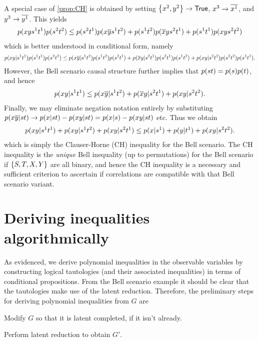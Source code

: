 A special case of \cref{prop:CH} is obtained by setting $\left\lbrace x^2,y^2\right\rbrace\to\mathsf{True}$, $x^3\to \overline{x^1}$, and $y^3\to \overline{y^1}$. This yields
\begin{align}
p\lparen x y s^1 t^1\rparen p\lparen s^2 t^2\rparen
\leq
p\lparen s^2 t^1\rparen p\lparen x \overline{y} s^1 t^2\rparen
+p\lparen s^1 t^2\rparen p\lparen\overline{x} y s^2 t^1\rparen
+p\lparen s^1 t^1\rparen p\lparen x y s^2 t^2\rparen
\end{align}
which is better understood in conditional form, namely
\begin{align}
p\lparen x y | s^1 t^1\rparen p\lparen s^1 t^1\rparen p\lparen s^2 t^2\rparen
\leq
p\lparen x \overline{y} | s^1 t^2\rparen p\lparen s^1 t^2\rparen p\lparen s^2 t^1\rparen 
+p\lparen\overline{x} y | s^2 t^1\rparen p\lparen s^2 t^1\rparen p\lparen s^1 t^2\rparen 
+p\lparen x y | s^2 t^2\rparen p\lparen s^2 t^2\rparen p\lparen s^1 t^1\rparen.
\end{align}
However, the Bell scenario causal structure further implies that $p\lparen s t\rparen=p\lparen s\rparen p\lparen t\rparen$, and hence
\begin{align}
p\lparen x y | s^1 t^1\rparen
\leq
p\lparen x \overline{y} | s^1 t^2\rparen
+p\lparen\overline{x} y | s^2 t^1\rparen
+p\lparen x y | s^2 t^2\rparen.
\end{align}
Finally, we may eliminate negation notation entirely by substituting $p\lparen x \overline{y} | s t\rparen \to p\lparen x | s t\rparen-p\lparen x y | s t\rparen = p\lparen x | s\rparen-p\lparen x y | s t\rparen$ etc. Thus we obtain
\begin{align}
p\lparen x y | s^1 t^1\rparen + p\lparen x y | s^1 t^2\rparen + p\lparen x y | s^2 t^1\rparen
\leq
p\lparen x | s^1\rparen
+p\lparen y | t^1\rparen
+p\lparen x y | s^2 t^2\rparen.
\end{align}
which is simply the Clauser-Horne (CH) inequality \cite{CHInequality} for the Bell scenario. The CH inequality is the \emph{unique} Bell inequality (up to permutations) for the Bell scenario if $\left\lbrace S,T,X,Y\right\rbrace$ are all binary, and hence the CH inequality is a necessary and sufficient criterion to ascertain if correlations are compatible with that Bell scenario variant.











\section{Deriving inequalities algorithmically}

As evidenced, we derive polynomial inequalities in the observable variables by constructing logical tautologies (and their associated inequalities) in terms of conditional propositions. From the Bell scenario example it should be clear that the tautologies make use of the latent reduction. Therefore, the preliminary steps for deriving polynomial inequalities from $G$ are
\begin{compactenum}
\item Modify $G$ so that it is latent completed, if it isn't already.
\item Perform latent reduction to obtain $G'$.
\end{compactenum}

